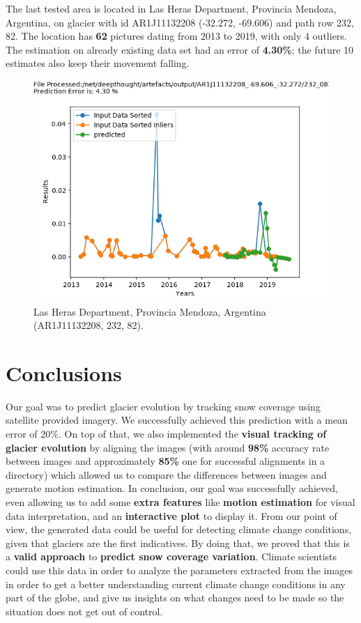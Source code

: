 \documentclass[12pt, a4paper]{report}
\begin{document}
	The last tested area is located in Las Heras Department, Provincia Mendoza, Argentina, on glacier with id AR1J11132208 (-32.272, -69.606) and path row 232, 82. The location has \textbf{62} pictures dating from 2013 to 2019, with only 4 outliers. The estimation on already existing data set had an error of \textbf{4.30\%}; the future 10 estimates also keep their movement falling.

	\begin{figure}[H]
		\centering
		\includegraphics[scale=0.4]{4.png}
		\caption{Las Heras Department, Provincia Mendoza, Argentina (AR1J11132208, 232, 82).}
		\label{fig:three}
	\end{figure}

	\newpage{}
	\chapter{Conclusions}
	
	Our goal was to predict glacier evolution by tracking snow coverage using satellite provided imagery. We successfully achieved this prediction with a mean error of 20\%. On top of that, we also implemented the \textbf{visual tracking of glacier evolution} by aligning the images (with around \textbf{98\% } accuracy rate between images and approximately \textbf{85\% } one for successful alignments in a directory) which allowed us to compare the differences between images and generate motion estimation. 
	\vskip 0.2cm
	In conclusion, our goal was successfully achieved, even allowing us to add some \textbf{extra features} like \textbf{motion estimation} for visual data interpretation, and an \textbf{interactive plot} to display it. 
	\vskip 0.2cm
	From our point of view, the generated data could be useful for detecting climate change conditions, given that glaciers are the first indicatives. By doing that, we proved that this is a \textbf{valid approach} to \textbf{predict snow coverage variation}. Climate scientists could use this data in order to analyze the parameters extracted from the images in order to get a better understanding current climate change conditions in any part of the globe, and give us insights on what changes need to be made so the situation does not get out of control.
	
\end{document}
